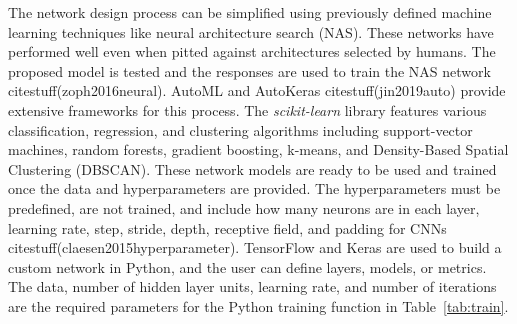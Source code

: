 \documentclass[preprint,12pt]{elsarticle}
\begin{document}
The network design process can be simplified using previously defined machine learning techniques like neural architecture search (NAS). These networks have performed well even when pitted against architectures selected by humans. The proposed model is tested and the responses are used to train the NAS network citestuff(zoph2016neural). AutoML and AutoKeras citestuff(jin2019auto) provide extensive frameworks for this process. The \textit{scikit-learn} library features various classification, regression, and clustering algorithms including support-vector machines, random forests, gradient boosting, k-means, and Density-Based Spatial Clustering (DBSCAN). These network models are ready to be used and trained once the data and hyperparameters are provided. The hyperparameters must be predefined, are not trained, and include how many neurons are in each layer, learning rate, step, stride, depth, receptive field, and padding for CNNs citestuff(claesen2015hyperparameter). TensorFlow and Keras are used to build a custom network in Python, and the user can define layers, models, or metrics. The data, number of hidden layer units, learning rate, and number of iterations are the required parameters for the Python training function in Table~\ref{tab:train}.
\end{document}
